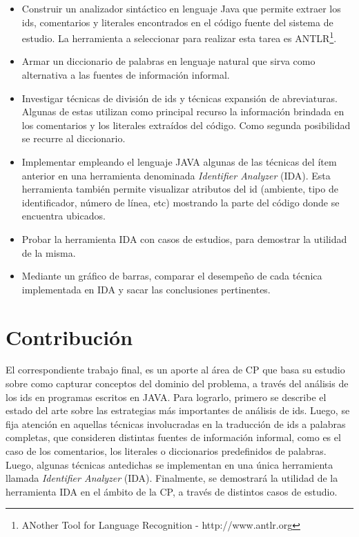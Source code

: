 \begin{itemize}
\itemsep0em%
\item Construir un analizador sintáctico en lenguaje Java que permite extraer los ids, comentarios y literales encontrados en el código fuente del sistema de estudio. La herramienta a seleccionar para realizar esta tarea es ANTLR\footnote[1]{ANother Tool for Language Recognition - http://www.antlr.org}.

\item Armar un diccionario de palabras en lenguaje natural que sirva como alternativa a las fuentes de información informal.

\item Investigar técnicas de división de ids y técnicas expansión de abreviaturas. Algunas de estas utilizan como principal recurso la información brindada en los comentarios y los literales extraídos del código. Como segunda posibilidad se recurre al diccionario.

\item Implementar empleando el lenguaje JAVA algunas de las técnicas del ítem anterior en una herramienta denominada \textit{Identifier Analyzer} (IDA). Esta herramienta también permite visualizar atributos del id (ambiente, tipo de identificador, número de línea, etc) mostrando la parte del código donde se encuentra ubicados.

\item Probar la herramienta IDA con casos de estudios, para demostrar la utilidad de la misma.

\item Mediante un gráfico de barras, comparar el desempeño de cada técnica implementada en IDA y sacar las conclusiones pertinentes.

\end{itemize}

\pagebreak 
\section{Contribución}

El correspondiente trabajo final, es un aporte al área de CP que basa su estudio sobre como capturar conceptos del dominio del problema, a través del análisis de los ids en programas escritos en JAVA. Para lograrlo, primero se describe el estado del arte sobre las estrategias más importantes de análisis de ids. Luego, se fija atención en aquellas técnicas involucradas en la traducción de ids a palabras completas, que consideren distintas fuentes de información informal, como es el caso de los comentarios, los literales o diccionarios predefinidos de palabras. Luego, algunas técnicas antedichas se implementan en una única herramienta llamada \textit{Identifier Analyzer} (IDA). Finalmente, se demostrará la utilidad de la herramienta IDA en el ámbito de la CP, a través de distintos casos de estudio.

